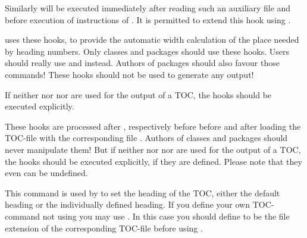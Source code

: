 Similarly  will be executed immediately after
reading such an auxiliary file and before execution of instructions of
. It is permitted to extend this hook
using .

\KOMAScript{} uses these hooks, to provide the automatic width calculation of
the place needed by heading numbers. Only classes and packages should use
these hooks. Users should really use
 and
 instead. Authors of packages should
also favour those commands! These hooks should not be used to generate any
output!

If neither  nor
 nor  are
used for the output of a TOC, the hooks should be executed explicitly.%
\EndIndexGroup


\begin{Declaration}
\end{Declaration}
These hooks are processed after , respectively
before  before and after loading the TOC-file with
the corresponding file . Authors  of
classes and packages should never manipulate them! But if
neither  nor
 nor  are
used for the output of a TOC, the hooks should be executed explicitly, if they
are defined. Please note that they even can be undefined.%
\EndIndexGroup


\begin{Declaration}
\end{Declaration}
This command is used by  to set the heading of the TOC,
either the default heading or the individually defined heading. If you define
your own TOC-command not using  you may use
. In this case you should define
 to be the file
extension of the corresponding TOC-file before using
.%
\EndIndexGroup


